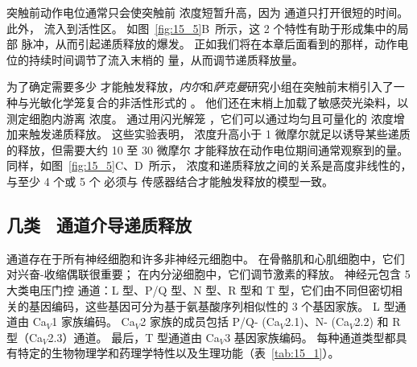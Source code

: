 突触前动作电位通常只会使突触前  浓度短暂升高，因为  通道只打开很短的时间。 
此外， 流入到活性区。
如图~\ref{fig:15_5}B~所示，这 2 个特性有助于形成集中的局部  脉冲，从而引起递质释放的爆发。
正如我们将在本章后面看到的那样，动作电位的持续时间调节了流入末梢的  量，从而调节递质释放量。


为了确定需要多少  才能触发释放，\textit{内尔}和\textit{萨克曼}研究小组在突触前末梢引入了一种与光敏化学笼复合的非活性形式的 。
他们还在末梢上加载了敏感荧光染料，以测定细胞内游离  浓度。
通过用闪光解笼 ，它们可以通过均匀且可量化的  浓度增加来触发递质释放。
这些实验表明， 浓度升高小于 1 微摩尔就足以诱导某些递质的释放，但需要大约 10 至 30 微摩尔  才能释放在动作电位期间通常观察到的量。
同样，如图~\ref{fig:15_5}C、D~所示， 浓度和递质释放之间的关系是高度非线性的，与至少 4 个或 5 个  必须与  传感器结合才能触发释放的模型一致。



\subsection{几类~ 通道介导递质释放}

通道存在于所有神经细胞和许多非神经元细胞中。
在骨骼肌和心肌细胞中，它们对兴奋-收缩偶联很重要；
在内分泌细胞中，它们调节激素的释放。
神经元包含 5 大类电压门控  通道：L 型、P/Q 型、N 型、R 型和 T 型，它们由不同但密切相关的基因编码，这些基因可分为基于氨基酸序列相似性的 3 个基因家族。
L 型通道由 Ca$_V$1 家族编码。
Ca$_V$2 家族的成员包括 P/Q- (Ca$_V$2.1)、N- (Ca$_V$2.2) 和 R 型（Ca$_V$2.3）通道。
最后，T 型通道由 Ca$_V$3 基因家族编码。 
每种通道类型都具有特定的生物物理学和药理学特性以及生理功能（表~\ref{tab:15_1}）。


